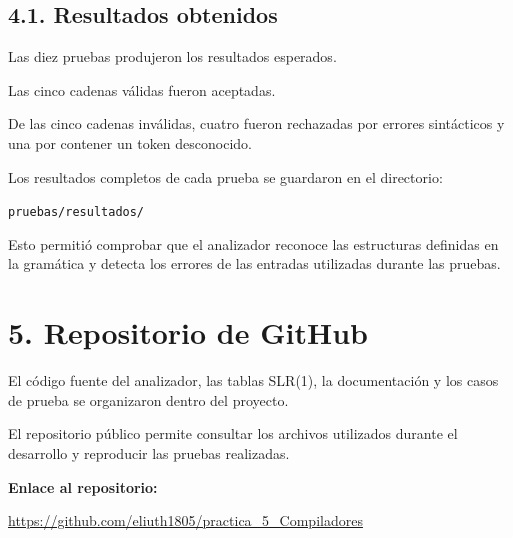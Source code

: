 \documentclass[11pt,letterpaper]{article}
\begin{document}
\normalsize

\subsection*{4.1. Resultados obtenidos}

Las diez pruebas produjeron los resultados esperados.

Las cinco cadenas válidas fueron aceptadas.

De las cinco cadenas inválidas, cuatro fueron
rechazadas por errores sintácticos y una por
contener un token desconocido.

Los resultados completos de cada prueba se
guardaron en el directorio:

\begin{center}
\texttt{pruebas/resultados/}
\end{center}

Esto permitió comprobar que el analizador
reconoce las estructuras definidas en la
gramática y detecta los errores de las
entradas utilizadas durante las pruebas.


\section*{5. Repositorio de GitHub}

El código fuente del analizador, las tablas
SLR(1), la documentación y los casos de prueba
se organizaron dentro del proyecto.

El repositorio público permite consultar
los archivos utilizados durante el desarrollo
y reproducir las pruebas realizadas.

\textbf{Enlace al repositorio:}

\begin{center}
\url{https://github.com/eliuth1805/practica_5_Compiladores}
\end{center}

\end{document}
